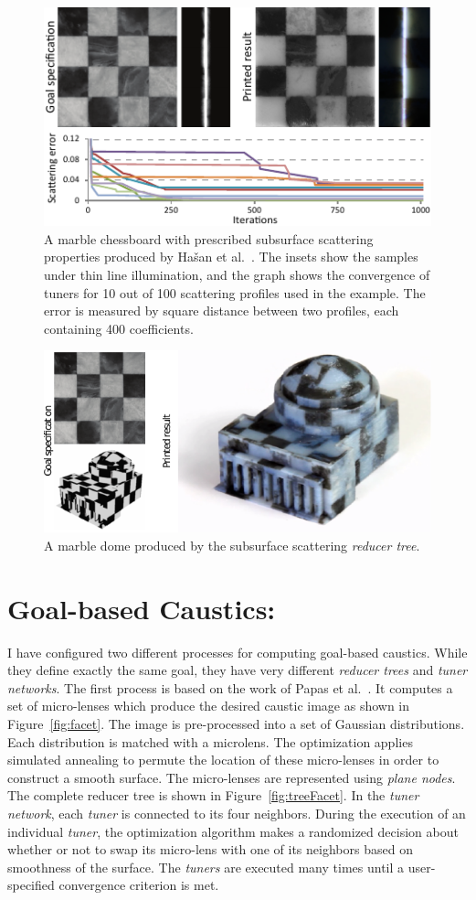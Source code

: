 \begin{figure}[h]
\centering
\includegraphics[width=0.65\linewidth]{figure/fig_chess.pdf}
\caption{
	A marble chessboard with prescribed subsurface scattering properties produced by Ha\v{s}an et al.~.
	The insets show the samples under thin line illumination, and the graph shows the convergence of tuners for 10 out of 100 scattering profiles used in the example. The error is measured by square distance between two profiles, each containing 400 coefficients.}
\label{fig:sub}
\end{figure}

\begin{figure}
\centering
\includegraphics[width=0.75\linewidth]{figure/dome.pdf}
\caption{
	A marble dome produced by the subsurface scattering \emph{reducer tree}.}
\label{fig:dome}
\end{figure}

\section{Goal-based Caustics:}
I have configured two different processes for computing goal-based caustics.
While they define exactly the same goal, they have very different \emph{reducer trees} and \emph{tuner networks}.
The first process is based on the work of Papas et al.~.
It computes a set of micro-lenses which produce the desired caustic image as shown in Figure~\ref{fig:facet}.
The image is pre-processed into a set of Gaussian distributions.
Each distribution is matched with a microlens.
The optimization applies simulated annealing to permute the location of these micro-lenses
in order to construct a smooth surface.
The micro-lenses are represented using \emph{plane nodes}.
The complete reducer tree is shown in Figure~\ref{fig:treeFacet}.
In the \emph{tuner network}, each \emph{tuner} is connected to its four neighbors.
During the execution of an individual \emph{tuner},
the optimization algorithm makes a randomized decision
about whether or not to swap its micro-lens with one of its neighbors based on smoothness of the surface.
The \emph{tuners} are executed many times until a user-specified convergence criterion is met. 

